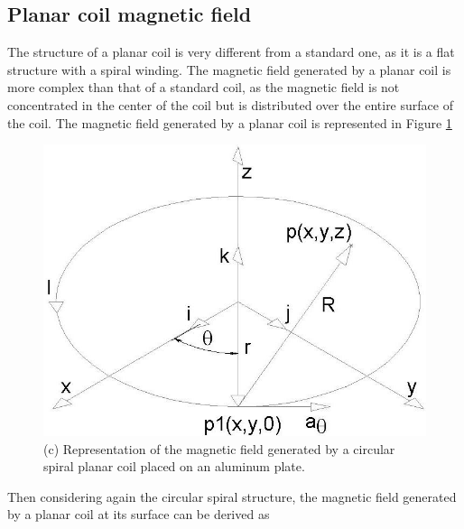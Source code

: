 \subsection{Planar coil magnetic field}
The structure of a planar coil is very different from a standard one, as it is a flat structure with a spiral winding. The magnetic field generated by a planar coil is more complex than that of a standard coil, as the magnetic field is not concentrated in the center of the coil but is distributed over the entire surface of the coil. The magnetic field generated by a planar coil is represented in Figure \ref{fig:Spiral_magn_field}

\begin{figure}[th]
    \centering
    \includegraphics[scale=0.4]{Chapters/Chapter2/PCB_coils/Figures/coil_field_diagram.png} %
    \caption[Spiral magn field]{(c) Representation of the magnetic field generated by a circular spiral planar coil placed on an aluminum plate.\cite{Spiral_Coil_magn_field}}
    \label{fig:Spiral_magn_field}
\end{figure}

Then considering again the circular spiral structure, the magnetic field generated by a planar coil at its surface can be derived as

